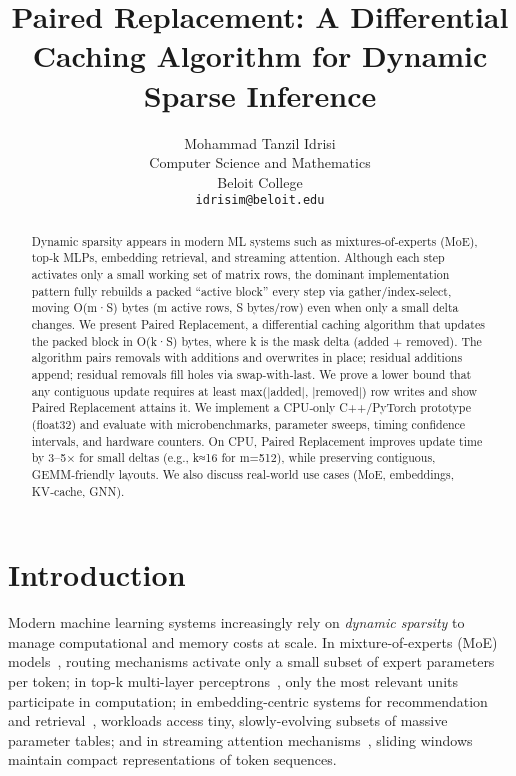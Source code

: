 \documentclass{article}
\title{Paired Replacement: A Differential Caching Algorithm for Dynamic Sparse Inference}
\author{ 
	{\hspace{1mm}Mohammad Tanzil Idrisi} \\
	Computer Science and Mathematics\\
	Beloit College\\
	\texttt{idrisim@beloit.edu} \\
}
\numberwithin{equation}{section}
\theoremstyle{plain}
\theoremstyle{definition}
\theoremstyle{remark}
\begin{document}
\maketitle
 
\begin{abstract}
Dynamic sparsity appears in modern ML systems such as mixtures‑of‑experts (MoE), top‑k MLPs, embedding retrieval, and streaming attention. Although each step activates only a small working set of matrix rows, the dominant implementation pattern fully rebuilds a packed “active block” every step via gather/index‑select, moving O(m·S) bytes (m active rows, S bytes/row) even when only a small delta changes. We present Paired Replacement, a differential caching algorithm that updates the packed block in O(k·S) bytes, where k is the mask delta (added + removed). The algorithm pairs removals with additions and overwrites in place; residual additions append; residual removals fill holes via swap‑with‑last. We prove a lower bound that any contiguous update requires at least max(|added|, |removed|) row writes and show Paired Replacement attains it. We implement a CPU‑only C++/PyTorch prototype (float32) and evaluate with microbenchmarks, parameter sweeps, timing confidence intervals, and hardware counters. On CPU, Paired Replacement improves update time by 3–5× for small deltas (e.g., k≈16 for m=512), while preserving contiguous, GEMM‑friendly layouts. We also discuss real‑world use cases (MoE, embeddings, KV‑cache, GNN).
\end{abstract}





\section{Introduction}

Modern machine learning systems increasingly rely on \emph{dynamic sparsity} to manage computational and memory costs at scale. In mixture-of-experts (MoE) models~\cite{shazeer2017outrageously, fedus2022switch}, routing mechanisms activate only a small subset of expert parameters per token; in top-k multi-layer perceptrons~\cite{zoph2022designing}, only the most relevant units participate in computation; in embedding-centric systems for recommendation and retrieval~\cite{kang2020deep}, workloads access tiny, slowly-evolving subsets of massive parameter tables; and in streaming attention mechanisms~\cite{dao2022flashattention}, sliding windows maintain compact representations of token sequences.
\end{document}
